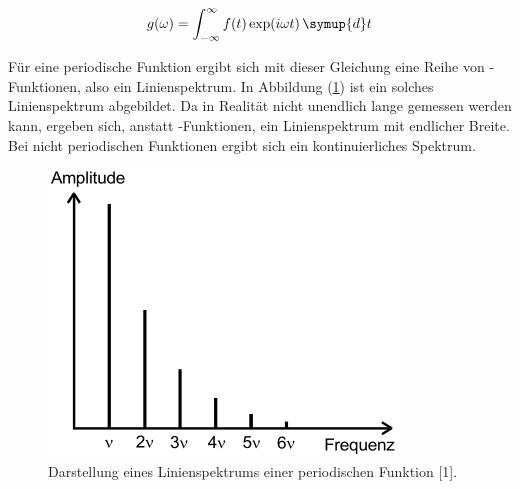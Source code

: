 \begin{equation}
  g(\omega) = \int_{-\infty}^{\infty} f(t) \exp(i\omega t) \, \symup{d}t
  \label{eq:3}
\end{equation}

Für eine periodische Funktion ergibt sich mit dieser Gleichung eine Reihe von
\delta-Funktionen, also ein Linienspektrum. In Abbildung (\ref{fig:1}) ist ein
solches Linienspektrum abgebildet. Da in Realität nicht unendlich lange gemessen werden kann,
ergeben sich, anstatt \delta-Funktionen, ein Linienspektrum mit endlicher Breite.
Bei nicht periodischen Funktionen ergibt sich ein kontinuierliches Spektrum.

\begin{figure}[H]
  \centering
  \includegraphics{Theorie1.png}
  \caption{Darstellung eines Linienspektrums einer periodischen Funktion [1].}
  \label{fig:1}
\end{figure}
